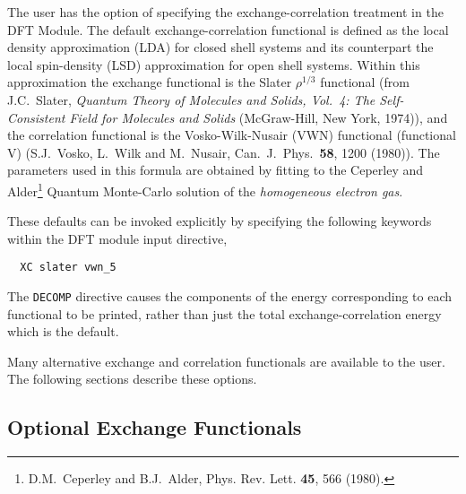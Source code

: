 The user has the option of specifying the exchange-correlation
treatment in the DFT Module.  The default exchange-correlation
functional is defined as the local density approximation (LDA) for
closed shell systems and its counterpart the local spin-density (LSD)
approximation for open shell systems.  Within this approximation the
exchange functional is the Slater $\rho^{1/3}$ functional (from
J.C.~Slater, {\sl Quantum Theory of Molecules and Solids, Vol.~4: The
  Self-Consistent Field for Molecules and Solids} (McGraw-Hill, New
York, 1974)), and the correlation functional is the Vosko-Wilk-Nusair
(VWN) functional (functional V) (S.J.~Vosko, L.~Wilk and M.~Nusair,
Can.~J.~Phys.~{\bf 58}, 1200 (1980)).  The parameters used in this
formula are obtained by fitting to the Ceperley and
Alder\footnote{D.M.~Ceperley and B.J.~Alder, Phys. Rev. Lett. {\bf
    45}, 566 (1980).}
Quantum Monte-Carlo solution of the {\em
  homogeneous electron gas}.

These defaults can be invoked explicitly by specifying the following
keywords within the DFT module input directive,
\begin{verbatim}
  XC slater vwn_5
\end{verbatim}

The \verb+DECOMP+ directive causes the components of the energy
corresponding to each functional to be printed, rather than just the
total exchange-correlation energy which is the default.

Many alternative exchange and correlation functionals are available to
the user.  The following sections describe these options.

\subsection{Optional Exchange Functionals}

